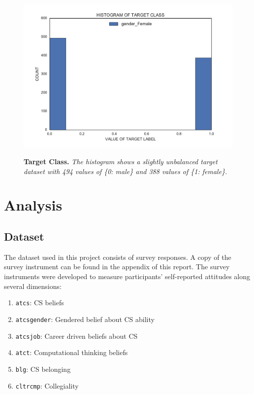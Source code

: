 \begin{figure}[!hbtp]
\centering

    \caption{\textbf{Target Class. }\textit{The histogram shows a slightly unbalanced target dataset with 494 values of \{0: male\} and 388 values of \{1: female\}.}}

    \includegraphics[width=1\textwidth]{figures/targetClass}
    \label{targetClass}
\end{figure}


\chapter*{Analysis}

\section* {Dataset}
The dataset used in this project consists of survey responses. A copy of the survey instrument can be found in the appendix of this report. The survey instruments were developed to measure participants' self-reported attitudes along several dimensions: 

\begin{enumerate}%
\item \texttt{atcs}: CS beliefs
\item \texttt{atcsgender}: Gendered belief about CS ability
\item \texttt{atcsjob}: Career driven beliefs about CS
\item \texttt{atct}: Computational thinking beliefs
\item \texttt{blg}: CS belonging
\item \texttt{cltrcmp}: Collegiality
\end{enumerate}

